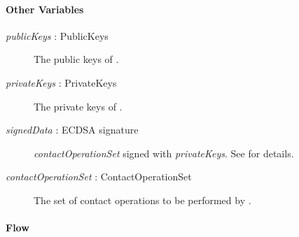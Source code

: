 \documentclass[a4paper,10pt]{article}
\newcommand{\signedData}{\emph{signedData}}
\newcommand{\privateKeys}{\emph{privateKeys}}
\newcommand{\publicKeys}{\emph{publicKeys}}
\newcommand{\contactOperationSet}{\emph{contactOperationSet}}
\begin{document}
\paragraph{Other Variables}
\SpecialItem
\begin{description}
 \item[\publicKeys{} : PublicKeys] The public keys of .
 \item[\privateKeys{} : PrivateKeys] The private keys of .
 \item[\signedData{} : ECDSA signature] \contactOperationSet{} signed with \privateKeys{}. See \cite{crypto_spec} for details.
 \item[\contactOperationSet{} : ContactOperationSet] The set of contact operations to be performed by \Server{}.
\end{description}

\paragraph{Flow}
\end{document}
